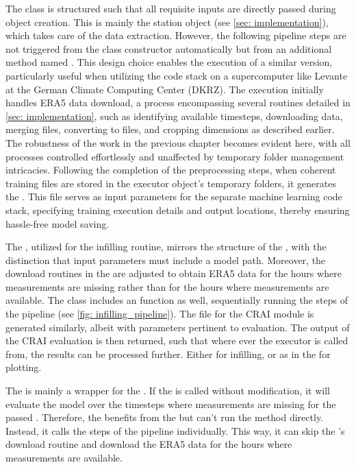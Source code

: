 The  class is structured such that all requisite inputs are directly passed during object creation. This is mainly the station object (see \autoref{sec: implementation}), which takes care of the data extraction. 
However, the following pipeline steps are not triggered from the class constructor automatically but from an additional method named .
This design choice enables the execution of a similar  version, particularly useful when utilizing the code stack on a supercomputer like Levante at the German Climate Computing Center (DKRZ).
The execution initially handles ERA5 data download, a process encompassing several routines detailed in \autoref{sec: implementation}, such as identifying available timesteps, downloading data, merging  files, converting to  files, and cropping dimensions as described earlier.
The robustness of the work in the previous chapter becomes evident here, with all processes controlled effortlessly and unaffected by temporary folder management intricacies.
Following the completion of the preprocessing steps, when coherent training files are stored in the executor object's temporary folders, it generates the .
This file serves as input parameters for the separate machine learning code stack, specifying training execution details and output locations, thereby ensuring hassle-free model saving.

The , utilized for the infilling routine, mirrors the structure of the , with the distinction that input parameters must include a model path.
Moreover, the download routines in the  are adjusted to obtain ERA5 data for the hours where measurements are missing rather than for the hours where measurements are available.
The class includes an  function as well, sequentially running the steps of the pipeline (see \autoref{fig: infilling_pipeline}).
The  file for the CRAI module is generated similarly, albeit with parameters pertinent to evaluation.
The output of the CRAI evaluation is then returned, such that where ever the executor is called from, the results can be processed further.
Either for infilling, or as in the  for plotting. 

The  is mainly a wrapper for the . If the  is called without modification, it will evaluate the model over the timesteps where measurements are missing for the passed . Therefore, the  benefits from the  but can't run the  method directly. Instead, it calls the steps of the pipeline individually. This way, it can skip the 's download routine and download the ERA5 data for the hours where measurements are available.



